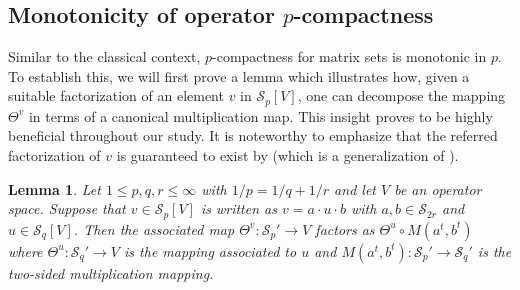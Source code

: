 \documentclass[11pt]{amsart}
\newtheorem{lemma}[theorem]{Lemma}
\numberwithin{equation}{section}
\begin{document}
\subsection{Monotonicity of operator $p$-compactness}



Similar to the classical context, $p$-compactness for matrix sets is monotonic in $p$. To establish this, we will first prove a lemma which illustrates how, given a suitable factorization of an element $v$ in $\mathcal{S}_p[V]$, one can decompose the mapping $\Theta^v$ in terms of a canonical multiplication map. This insight proves to be highly beneficial throughout our study.
It is noteworthy to emphasize that the referred factorization of $v$ is guaranteed to exist by \cite[Lem. 4.2]{CD-completely-mixing} (which is a generalization of \cite[Thm. 1.5]{Pisier-Asterisque}).

\begin{lemma}\label{lemma-factorization-Pisier}
Let $1 \le p , q, r \le \infty$ with $1/p = 1/q + 1/r$ and let $V$ be an operator space.
Suppose  that $v \in \mathcal{S}_p[V]$ is written as $v = a \cdot u \cdot b$ with $a,b \in \mathcal{S}_{2r}$ and $u \in \mathcal{S}_q[V]$. Then the associated map $\Theta^v : \mathcal{S}_{p}' \to V$ factors as $\Theta^u \circ M(a^t, b^t)$ where $\Theta^u : \mathcal{S}_{q}' \to V$ is the mapping associated to $u$ and $M(a^t, b^t) : \mathcal{S}_{p}' \to \mathcal{S}_{q}'$ is the two-sided multiplication mapping.
\end{lemma}
\end{document}
